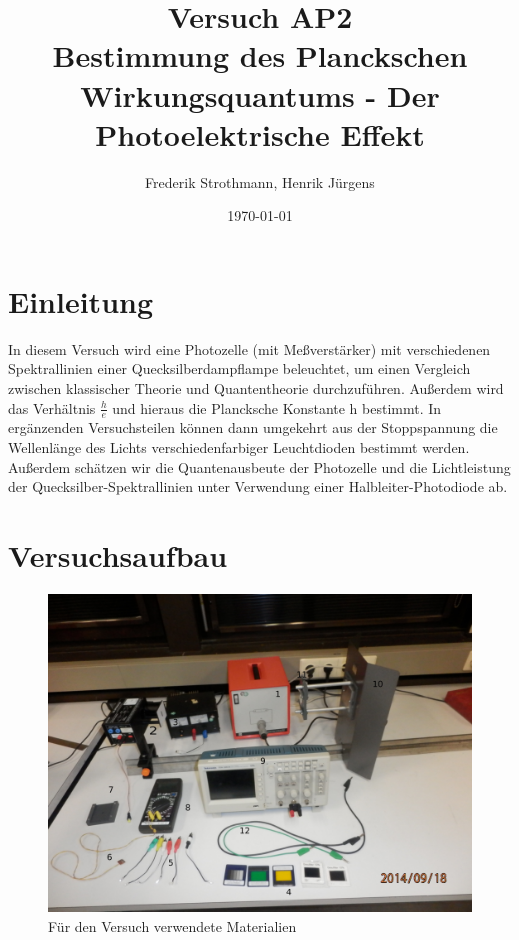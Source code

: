 \documentclass[12px]{scrartcl}
\title{Versuch AP2\\ Bestimmung des Planckschen Wirkungsquantums - Der Photoelektrische Effekt}
\author{Frederik Strothmann, Henrik Jürgens}
\date{\today}
\begin{document}

\maketitle
\tableofcontents
\newpage


\section{Einleitung}

In diesem Versuch wird eine Photozelle (mit Meßverstärker) mit verschiedenen Spektrallinien einer Quecksilberdampflampe beleuchtet, um einen Vergleich zwischen klassischer Theorie und Quantentheorie durchzuführen.
Außerdem wird das Verhältnis $\frac{h}{e}$ und hieraus die Plancksche Konstante h
bestimmt.
In ergänzenden Versuchsteilen können dann umgekehrt aus der Stoppspannung die Wellenlänge des Lichts verschiedenfarbiger Leuchtdioden bestimmt werden.
Außerdem schätzen wir die Quantenausbeute der Photozelle und die Lichtleistung der Quecksilber-Spektrallinien
unter Verwendung einer Halbleiter-Photodiode ab.

\section{Versuchsaufbau}
													
\begin{figure}[H]
\centering
    \includegraphics[scale = 0.2]{versuchsmaterialien.pdf}
  	\caption[Für den Versuch verwendete Materialien]{Für den Versuch verwendete Materialien}
  \label{fig:a_3_A}
\end{figure}
\end{document}
